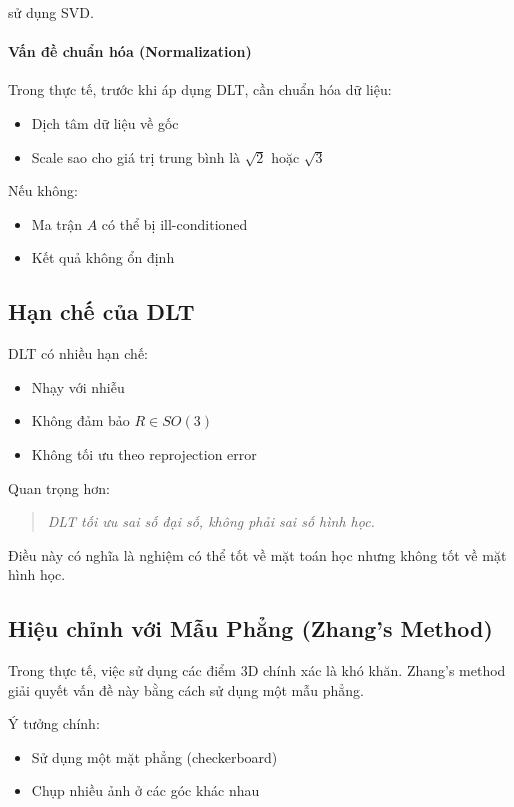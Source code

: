 sử dụng SVD.

\paragraph{Vấn đề chuẩn hóa (Normalization)}

Trong thực tế, trước khi áp dụng DLT, cần chuẩn hóa dữ liệu:
\begin{itemize}
	\item Dịch tâm dữ liệu về gốc
	\item Scale sao cho giá trị trung bình là $\sqrt{2}$ hoặc $\sqrt{3}$
\end{itemize}

Nếu không:
\begin{itemize}
	\item Ma trận $A$ có thể bị ill-conditioned
	\item Kết quả không ổn định
\end{itemize}

\subsection{Hạn chế của DLT}
\label{subsec:dlt_limitations}

DLT có nhiều hạn chế:

\begin{itemize}
	\item Nhạy với nhiễu
	\item Không đảm bảo $R \in SO(3)$
	\item Không tối ưu theo reprojection error
\end{itemize}

Quan trọng hơn:

\begin{quote}
	\textit{DLT tối ưu sai số đại số, không phải sai số hình học.}
\end{quote}

Điều này có nghĩa là nghiệm có thể tốt về mặt toán học nhưng không tốt về mặt hình học.

\subsection{Hiệu chỉnh với Mẫu Phẳng (Zhang's Method)}
\label{subsec:zhang_method}

Trong thực tế, việc sử dụng các điểm 3D chính xác là khó khăn. Zhang's method giải quyết vấn đề này bằng cách sử dụng một mẫu phẳng.

Ý tưởng chính:
\begin{itemize}
	\item Sử dụng một mặt phẳng (checkerboard)
	\item Chụp nhiều ảnh ở các góc khác nhau
\end{itemize}

